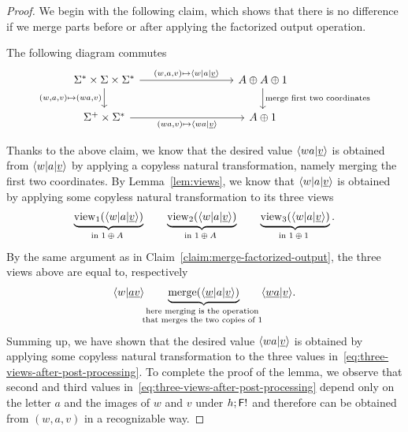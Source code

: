 \begin{proof}
    We begin with the following claim, which shows that there is no difference if we merge parts before or after applying the factorized output operation.
    \begin{claim}\label{claim:merge-factorized-output}
        The following diagram commutes 
        \[
        \begin{tikzcd}
            [column sep=3cm]
        \Sigma^* \times \Sigma \times \Sigma^* 
        \ar[r,"{(w,a,v) \mapsto \tuple{w|a|\underline v}}"]
        \ar[d,"{(w,a,v) \mapsto (wa,v)}"']
        &
        A \oplus A \oplus 1
        \ar[d,"\text{merge first two coordinates}"]
        \\
        \Sigma^+ \times \Sigma^* 
        \ar[r,"{(wa,v) \mapsto \tuple{wa|\underline v}}"']
        &
        A  \oplus 1
        \end{tikzcd}
        \]
    \end{claim}

    Thanks to the above claim, we know that  the desired value $\langle wa|\underline v \rangle$ is obtained from  $\langle w|a| \underline v \rangle$
    by applying a copyless natural transformation, namely merging the first two coordinates. 
     By Lemma~\ref{lem:views}, we know that $\langle w|a| \underline v \rangle$ is obtained by applying some copyless natural transformation to its three views 
     \begin{align*}
     \myunderbrace{\view_1(\tuple{w|a| \underline v}) }{in $1 \oplus A$}
    \qquad
    \myunderbrace{\view_2(\tuple{w|a| \underline v}) }{in $1 \oplus A$}
     \qquad 
     \myunderbrace{\view_3(\tuple{w|a| \underline v}) }{in $1 \oplus 1$}.
    \end{align*}
    By the same argument as in Claim~\ref{claim:merge-factorized-output}, the three views above are equal to, respectively
    \begin{align}
        \label{eq:three-views-after-post-processing}
       \tuple{w|\underline a \underline v}
       \qquad
\myunderbrace{\mathrm{merge}(\tuple{\underline w| a| \underline v}) }{here merging is the operation \\ 
that merges the two copies of $1$}
       \qquad 
        \tuple{\underline {wa}| \underline v}.
    \end{align}
    Summing up, we have shown that the desired value $\langle wa| \underline v \rangle$ is obtained by applying some copyless natural transformation to the three values in~\eqref{eq:three-views-after-post-processing}. To complete the proof of the lemma, we  observe that  second and third values in~\eqref{eq:three-views-after-post-processing} depend only on the letter $a$ and the images of $w$ and $v$ under $h;\mathsf F !$ and therefore can be obtained from $(w,a,v)$ in a recognizable way.
\end{proof}


